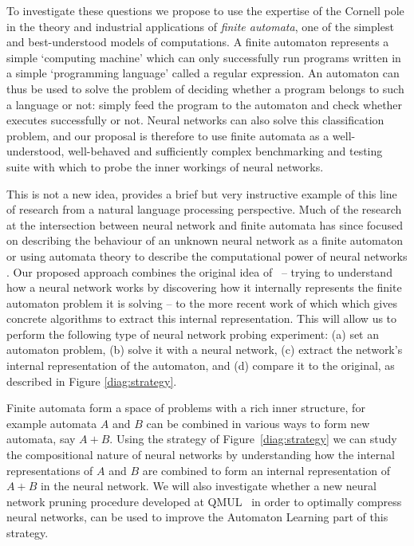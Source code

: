 \documentclass[11pt,a4paper]{article}
\begin{document}
	To investigate these questions we propose to use the expertise of the Cornell pole in the theory and industrial applications of \emph{finite automata}, one of the simplest and best-understood models of computations. A finite automaton represents a simple `computing machine' which can only successfully run programs written in a simple `programming language' called a regular expression. An automaton can thus be used to solve the problem of deciding whether a program belongs to such a language or not: simply feed the program to the automaton and check whether executes successfully or not. Neural networks can also solve this classification problem, and our proposal is therefore to use finite automata as a well-understood, well-behaved and sufficiently complex benchmarking and testing suite with which to probe the inner workings of neural networks. 
	
	
	This is not a new idea, \cite{cleeremans1989finite} provides a brief but very instructive example of this line of research from a natural language processing perspective. Much of the research at the intersection between neural network and finite automata has since focused on describing the behaviour of an unknown neural network as a finite automaton \cite{weiss2018extracting,weiss2019learning} or using automata theory to describe the computational power of neural networks \cite{weiss2018practical}. Our proposed approach combines the original idea of~\cite{cleeremans1989finite} -- trying to understand how a neural network works by discovering how it internally represents the finite automaton problem it is solving -- to the more recent work of \cite{weiss2018extracting,weiss2019learning} which which gives concrete algorithms to extract this internal representation. This will allow us to perform the following type of neural network probing experiment: (a) set an automaton problem, (b) solve it with a neural network, (c) extract the network's internal representation of the automaton, and (d) compare it to the original, as described in Figure \ref{diag:strategy}. 
	
	
	Finite automata form a space of problems with a rich inner structure, for example automata $A$ and $B$ can be combined in various ways to form new automata, say $A+B$. Using the strategy of Figure~\ref{diag:strategy} we can study the compositional nature of neural networks by understanding how the internal representations of $A$ and $B$ are combined to form an internal representation of $A+B$ in the neural network. We will also investigate whether a new neural network pruning procedure developed at QMUL~\cite{pruning} in order to optimally compress neural networks, can be used to improve the Automaton Learning part of this strategy.	
	
\end{document}
